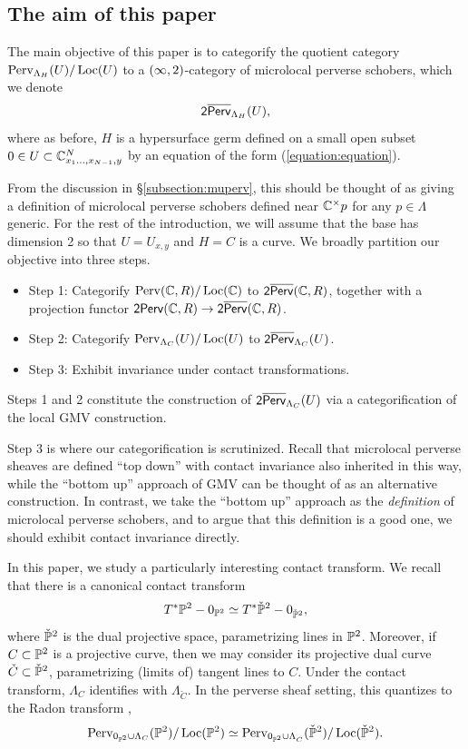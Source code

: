 \subsection{The aim of this paper}
The main objective of this paper is to categorify the quotient category $\operatorname{Perv}_{\Lambda_H}(U)/\operatorname{Loc}(U)$ to a $(\infty,2)$-category of microlocal perverse schobers, which we denote
\[\mathsf{2}\overline{\mathsf{Perv}}_{\Lambda_H}(U),\]
where as before, $H$ is a hypersurface germ defined on a small open subset $0\in U\subset \mathbb{C}^N_{x_1\dots,x_{N-1},y}$ by an equation of the form (\ref{equation:equation}).

From the discussion in \S\ref{subsection:muperv}, this should be thought of as giving a definition of microlocal perverse schobers defined near $\mathbb{C}^\times p$ for any $p\in\Lambda$ generic. For the rest of the introduction, we will assume that the base has dimension 2 so that $U=U_{x,y}$ and $H=C$ is a curve. We broadly partition our objective into three steps.

\begin{itemize}
    \item Step 1: Categorify $\operatorname{Perv}(\mathbb{C},R)/\operatorname{Loc}(\mathbb{C})$ to $\mathsf{2}\overline{\mathsf{Perv}}(\mathbb{C},R)$, together with a projection functor $\mathsf{2Perv}(\mathbb{C},R)\to \mathsf{2}\overline{\mathsf{Perv}}(\mathbb{C},R)$.
    \item Step 2: Categorify $\operatorname{Perv}_{\Lambda_C}(U)/\operatorname{Loc}(U)$ to $\mathsf{2}\overline{\mathsf{Perv}}_{\Lambda_C}(U)$.
    \item Step 3: Exhibit invariance under contact transformations.
\end{itemize}

Steps 1 and 2 constitute the construction of $\mathsf{2}\overline{\mathsf{Perv}}_{\Lambda_C}(U)$ via a categorification of the local GMV construction.

Step 3 is where our categorification is scrutinized. Recall that microlocal perverse sheaves are defined ``top down'' with contact invariance also inherited in this way, while the ``bottom up'' approach of GMV can be thought of as an alternative construction. In contrast, we take the ``bottom up'' approach as the \textit{definition} of microlocal perverse schobers, and to argue that this definition is a good one, we should exhibit contact invariance directly.

In this paper, we study a particularly interesting contact transform. We recall that there is a canonical contact transform
\[T^*\mathbb{P}^2 - 0_{\mathbb{P}^2}\simeq T^*\check{\mathbb{P}}^2 - 0_{\check{\mathbb{P}}^2},\]
where $\check{\mathbb{P}}^2$ is the dual projective space, parametrizing lines in $\mathbb{P}^2$. Moreover, if $C\subset \mathbb{P}^2$ is a projective curve, then we may consider its projective dual curve $\check{C}\subset\check{\mathbb{P}}^2$, parametrizing (limits of) tangent lines to $C$. Under the contact transform, $\Lambda_{C}$ identifies with $\Lambda_{\check{C}}$. In the perverse sheaf setting, this quantizes to the Radon transform \cite{kiehlLefschetzTheoryBrylinskiRadon2001},
\[\operatorname{Perv}_{0_{\mathbb{P}^2}\cup \Lambda_{C}}(\mathbb{P}^2)/\operatorname{Loc}(\mathbb{P}^2)\simeq \operatorname{Perv}_{0_{\check{\mathbb{P}}^2}\cup \Lambda_{\check{C}}}(\check{\mathbb{P}}^2)/\operatorname{Loc}(\check{\mathbb{P}}^2).\]

